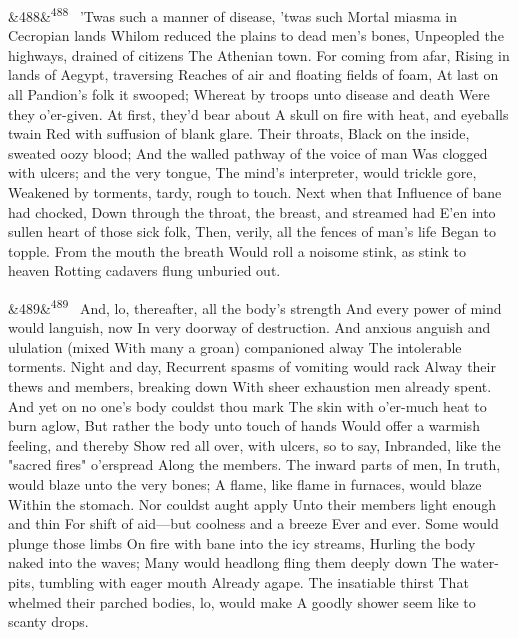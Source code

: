 \documentclass[12pt]{article}
\newcommand{\para}[1][]{\par\noindent\ifx&#1&\else\textsuperscript{\footnotesize #1}~\fi}
\begin{document}
\para[488] 'Twas such a manner of disease, 'twas such Mortal miasma in Cecropian lands Whilom reduced the plains to dead men's bones, Unpeopled the highways, drained of citizens The Athenian town. For coming from afar, Rising in lands of Aegypt, traversing Reaches of air and floating fields of foam, At last on all Pandion's folk it swooped; Whereat by troops unto disease and death Were they o'er-given. At first, they'd bear about A skull on fire with heat, and eyeballs twain Red with suffusion of blank glare. Their throats, Black on the inside, sweated oozy blood; And the walled pathway of the voice of man Was clogged with ulcers; and the very tongue, The mind's interpreter, would trickle gore, Weakened by torments, tardy, rough to touch. Next when that Influence of bane had chocked, Down through the throat, the breast, and streamed had E'en into sullen heart of those sick folk, Then, verily, all the fences of man's life Began to topple. From the mouth the breath Would roll a noisome stink, as stink to heaven Rotting cadavers flung unburied out.

\para[489] And, lo, thereafter, all the body's strength And every power of mind would languish, now In very doorway of destruction. And anxious anguish and ululation (mixed With many a groan) companioned alway The intolerable torments. Night and day, Recurrent spasms of vomiting would rack Alway their thews and members, breaking down With sheer exhaustion men already spent. And yet on no one's body couldst thou mark The skin with o'er-much heat to burn aglow, But rather the body unto touch of hands Would offer a warmish feeling, and thereby Show red all over, with ulcers, so to say, Inbranded, like the "sacred fires" o'erspread Along the members. The inward parts of men, In truth, would blaze unto the very bones; A flame, like flame in furnaces, would blaze Within the stomach. Nor couldst aught apply Unto their members light enough and thin For shift of aid---but coolness and a breeze Ever and ever. Some would plunge those limbs On fire with bane into the icy streams, Hurling the body naked into the waves; Many would headlong fling them deeply down The water-pits, tumbling with eager mouth Already agape. The insatiable thirst That whelmed their parched bodies, lo, would make A goodly shower seem like to scanty drops.
\end{document}
